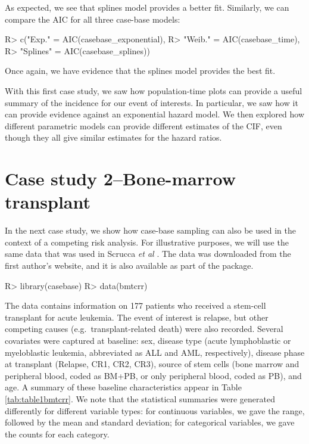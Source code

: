 \documentclass[
]{jss}
\begin{document}
As expected, we see that splines model provides a better fit. Similarly,
we can compare the AIC for all three case-base models:

\begin{CodeChunk}

\begin{CodeInput}
R> c("Exp." = AIC(casebase_exponential),
R>   "Weib." = AIC(casebase_time),
R>   "Splines" = AIC(casebase_splines))
\end{CodeInput}
\end{CodeChunk}

Once again, we have evidence that the splines model provides the best
fit.

With this first case study, we saw how population-time plots can provide
a useful summary of the incidence for our event of interests. In
particular, we saw how it can provide evidence against an exponential
hazard model. We then explored how different parametric models can
provide different estimates of the CIF, even though they all give
similar estimates for the hazard ratios.

\hypertarget{case-study-2bone-marrow-transplant}{%
\section{Case study 2--Bone-marrow
transplant}\label{case-study-2bone-marrow-transplant}}

In the next case study, we show how case-base sampling can also be used
in the context of a competing risk analysis. For illustrative purposes,
we will use the same data that was used in Scrucca \emph{et al}
\citeyearpar{scrucca2010regression}. The data was downloaded from the
first author's website, and it is also available as part of the
 package.

\begin{CodeChunk}

\begin{CodeInput}
R> library(casebase)
R> data(bmtcrr)
\end{CodeInput}
\end{CodeChunk}

The data contains information on 177 patients who received a stem-cell
transplant for acute leukemia. The event of interest is relapse, but
other competing causes (e.g.~transplant-related death) were also
recorded. Several covariates were captured at baseline: sex, disease
type (acute lymphoblastic or myeloblastic leukemia, abbreviated as ALL
and AML, respectively), disease phase at transplant (Relapse, CR1, CR2,
CR3), source of stem cells (bone marrow and peripheral blood, coded as
BM+PB, or only peripheral blood, coded as PB), and age. A summary of
these baseline characteristics appear in Table \ref{tab:table1bmtcrr}.
We note that the statistical summaries were generated differently for
different variable types: for continuous variables, we gave the range,
followed by the mean and standard deviation; for categorical variables,
we gave the counts for each category.
\end{document}
